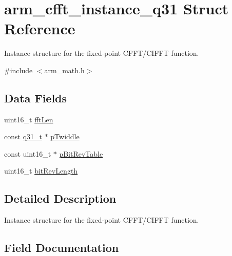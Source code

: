 \hypertarget{structarm__cfft__instance__q31}{}\section{arm\+\_\+cfft\+\_\+instance\+\_\+q31 Struct Reference}
\label{structarm__cfft__instance__q31}


Instance structure for the fixed-\/point C\+F\+F\+T/\+C\+I\+F\+FT function.  




{\ttfamily \#include $<$arm\+\_\+math.\+h$>$}

\subsection*{Data Fields}
\begin{DoxyCompactItemize}
\item 
uint16\+\_\+t \mbox{\hyperlink{structarm__cfft__instance__q31_ab8db3bbe7c61e6bb8ca2a55e3446e11a}{fft\+Len}}
\item 
const \mbox{\hyperlink{arm__math_8h_adc89a3547f5324b7b3b95adec3806bc0}{q31\+\_\+t}} $\ast$ \mbox{\hyperlink{structarm__cfft__instance__q31_a9760c603af5d85652496dbffd63a8a2e}{p\+Twiddle}}
\item 
const uint16\+\_\+t $\ast$ \mbox{\hyperlink{structarm__cfft__instance__q31_a3b229432d381b0a511a9cdbe3aa74e78}{p\+Bit\+Rev\+Table}}
\item 
uint16\+\_\+t \mbox{\hyperlink{structarm__cfft__instance__q31_a65e1b3e327b8fab9404287ed8f347cc8}{bit\+Rev\+Length}}
\end{DoxyCompactItemize}


\subsection{Detailed Description}
Instance structure for the fixed-\/point C\+F\+F\+T/\+C\+I\+F\+FT function. 

\subsection{Field Documentation}
\mbox{\label{structarm__cfft__instance__q31_a65e1b3e327b8fab9404287ed8f347cc8}} 

